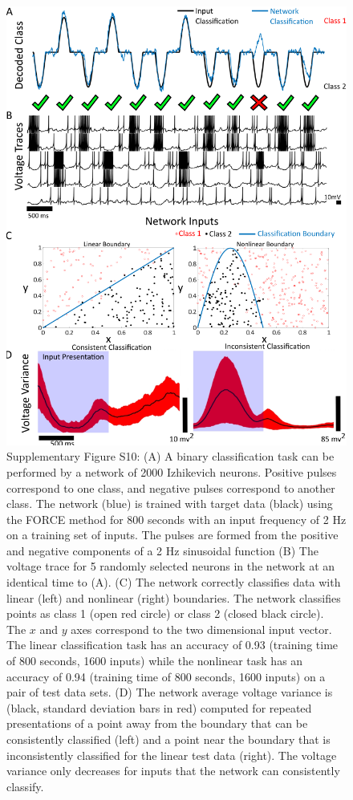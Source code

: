\documentclass[11pt]{article} %
\begin{document}
\begin{figure}[htp!]
\centering
\includegraphics[scale=0.8]{FFIGS12}
\caption*{Supplementary Figure S10:  (A) A binary classification task can be performed by a network of 2000 Izhikevich neurons.  Positive pulses correspond to one class, and negative pulses correspond to another class.  The network (blue) is trained with target data (black) using the FORCE method for 800 seconds with an input frequency of 2 Hz on a training set of inputs.  The pulses are formed from the positive and negative components of a 2 Hz sinusoidal function (B) The voltage trace for 5 randomly selected neurons in the network at an identical time to (A).  (C) The network correctly classifies data with linear (left) and nonlinear (right) boundaries.  The network classifies points as class 1 (open red circle) or class 2 (closed black circle).  The $x$ and $y$ axes correspond to the two dimensional input vector.   The linear classification task has an accuracy of 0.93 (training time of 800 seconds, 1600 inputs) while the nonlinear task has an accuracy of 0.94 (training time of 800 seconds, 1600 inputs) on a pair of test data sets.  (D)  The network average voltage variance is (black, standard deviation bars in red) computed for repeated presentations of a point away from the boundary that can be consistently classified (left) and a point near the boundary that is inconsistently classified for the linear test data (right).  The voltage variance only decreases for inputs that the network can consistently classify.      }\label{FORCE3}
\end{figure}
 
\end{document}
